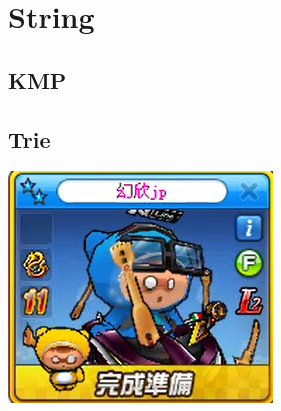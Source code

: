 \section{String}
    \subsection{KMP}
        
    \subsection{Trie}
        
\includegraphics{Contents/runrun.png}